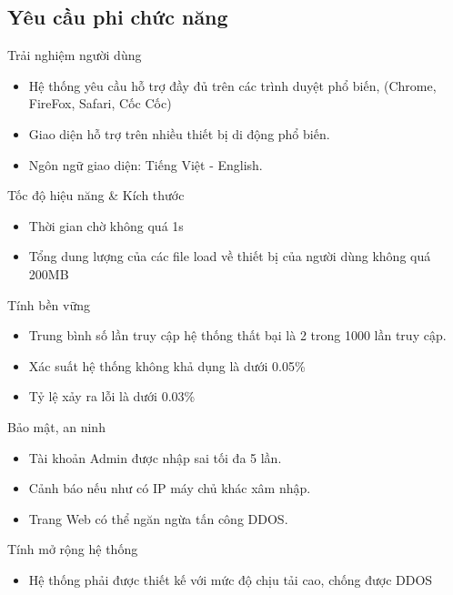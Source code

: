 \subsection{Yêu cầu phi chức năng}
Trải nghiệm người dùng
\begin{itemize}
    \item Hệ thống yêu cầu hỗ trợ đầy đủ trên các trình duyệt phổ biến, (Chrome, FireFox, Safari, Cốc Cốc)
    \item Giao diện hỗ trợ trên nhiều thiết bị di động phổ biến.
    \item Ngôn ngữ giao diện: Tiếng Việt - English.
\end{itemize}
\noindent
Tốc độ hiệu năng \& Kích thước
\begin{itemize}
    \item Thời gian chờ không quá 1s
    \item Tổng dung lượng của các file load về thiết bị của người dùng không quá 200MB
\end{itemize}
\noindent
Tính bền vững
\begin{itemize}
    \item Trung bình số lần truy cập hệ thống thất bại là 2 trong 1000 lần truy cập.
    \item Xác suất hệ thống không khả dụng là dưới 0.05\%
    \item Tỷ lệ xảy ra lỗi là dưới 0.03\%
\end{itemize}
Bảo mật, an ninh
\begin{itemize}
    \item  Tài khoản Admin được nhập sai tối đa 5 lần.
    \item  Cảnh báo nếu như có IP máy chủ khác xâm nhập.
    \item  Trang Web có thể ngăn ngừa tấn công DDOS. 
\end{itemize}
Tính mở rộng hệ thống
\begin{itemize}
    \item Hệ thống phải được thiết kế với mức độ chịu tải cao, chống được DDOS
\end{itemize}